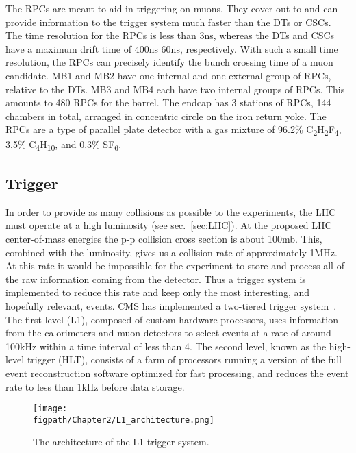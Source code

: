 The RPCs are meant to aid in triggering on muons.
They cover out to  and can provide information to the trigger system much faster than the DTs or CSCs.
The time resolution for the RPCs is less than 3\unit{ns}, whereas the DTs and CSCs have a maximum drift time of 400\unit{ns} 60\unit{ns}, respectively.
With such a small time resolution, the RPCs can precisely identify the bunch crossing time of a muon candidate.
MB1 and MB2 have one internal and one external group of RPCs, relative to the DTs.
MB3 and MB4 each have two internal groups of RPCs.
This amounts to 480 RPCs for the barrel.
The endcap has 3 stations of RPCs, 144 chambers in total, arranged in concentric circle on the iron return yoke.
The RPCs are a type of parallel plate detector with a gas mixture of 96.2\% C\textsubscript{2}H\textsubscript{2}F\textsubscript{4}, 3.5\% C\textsubscript{4}H\textsubscript{10}, and 0.3\% SF\textsubscript{6}.

\subsection{Trigger}

In order to provide as many collisions as possible to the experiments, the LHC must operate at a high luminosity (see sec.~\ref{sec:LHC}).
At the proposed LHC center-of-mass energies the p-p collision cross section is about 100\unit{mb}.
This, combined with the luminosity, gives us a collision rate of approximately 1\unit{MHz}.
At this rate it would be impossible for the experiment to store and process all of the raw information coming from the detector.
Thus a trigger system is implemented to reduce this rate and keep only the most interesting, and hopefully relevant, events.
CMS has implemented a two-tiered trigger system~\cite{Khachatryan:2016bia}.
The first level (L1), composed of custom hardware processors, uses information from the calorimeters and muon detectors to select events at a rate of around 100\unit{kHz} within a time interval of less than 4\mus.
The second level, known as the high-level trigger (HLT), consists of a farm of processors running a version of the full event reconstruction software optimized for fast processing, and reduces the event rate to less than 1\unit{kHz} before data storage.

\begin{figure}[!hbt]
    \centering
    \texttt{[image: \\figpath/Chapter2/L1\_architecture.png]}
    \caption{The architecture of the L1 trigger system.}
    \label{fig:CMS_L1_architecture}
\end{figure}

